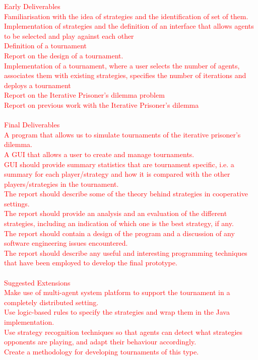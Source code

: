 \documentclass{article}
\begin{document}
\textcolor{red}{\noindent Early Deliverables\\
Familiarisation with the idea of strategies and the identification of set of them.\\
Implementation of strategies and the definition of an interface that allows agents to be selected and play against each other\\
Definition of a tournament\\
Report on the design of a tournament.\\
Implementation of a tournament, where a user selects the number of agents, associates them with existing strategies, specifies the number of iterations and deploys a tournament\\
Report on the Iterative Prisoner's dilemma problem\\
Report on previous work with the Iterative Prisoner's dilemma\\\\
 Final Deliverables\\
A program that allows us to simulate tournaments of the iterative prisoner's dilemma.\\
A GUI that allows a user to create and manage tournaments.\\
GUI should provide summary statistics that are tournament specific, i.e. a summary for each player/strategy and how it is compared with the other players/strategies in the tournament.\\
The report should describe some of the theory behind strategies in cooperative settings.\\
The report should provide an analysis and an evaluation of the different strategies, including an indication of which one is the best strategy, if any.\\
The report should contain a design of the program and a discussion of any software engineering issues encountered.\\
The report should describe any useful and interesting programming techniques that have been employed to develop the final prototype.\\\\
Suggested Extensions\\
Make use of multi-agent system platform to support the tournament in a completely distributed setting.\\
Use logic-based rules to specify the strategies and wrap them in the Java implementation.\\
Use strategy recognition techniques so that agents can detect what strategies opponents are playing, and adapt their behaviour accordingly.\\
Create a methodology for developing tournaments of this type.\\}
\end{document}
